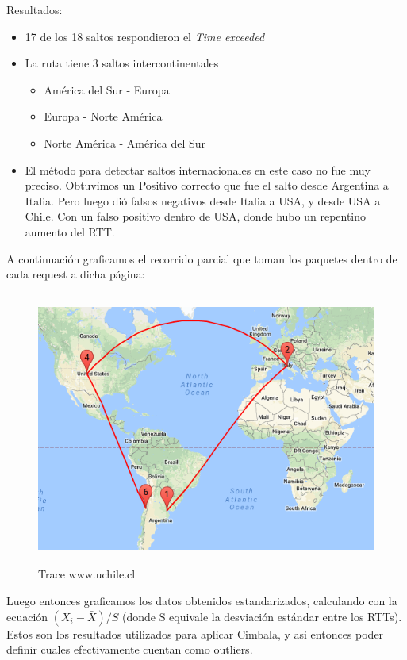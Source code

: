 \documentclass[a4paper,10pt]{article}
\begin{document}
\medskip
\medskip
\medskip

\medskip
\par{Resultados:}
\begin{itemize}
    \item  17 de los 18 saltos respondieron el \textit{Time exceeded}
    \item La ruta tiene 3 saltos intercontinentales
    \begin{itemize}
        \item América del Sur - Europa
        \item Europa - Norte América
        \item Norte América - América del Sur
    \end{itemize}
    \item El método para detectar saltos internacionales en este caso no fue muy preciso. Obtuvimos un Positivo correcto que fue el salto desde Argentina a Italia. Pero luego dió falsos negativos desde Italia a USA, y desde USA a Chile. Con un falso positivo dentro de USA, donde hubo un repentino aumento del RTT.
\end{itemize}

\medskip
\par{A continuación graficamos el recorrido parcial que toman los paquetes dentro de cada request a dicha página: }
\medskip
\begin{figure}[H]
    \centering
    \includegraphics[height=9cm]{imagenes/chileUniChile.png}
    \caption{Trace www.uchile.cl}
\end{figure}


\medskip
\medskip
\par{Luego entonces graficamos los datos obtenidos estandarizados, calculando con la ecuación $(X_{i} - \bar{X}) /S $ (donde S equivale la desviación estándar entre los RTTs). Estos son los resultados utilizados para aplicar Cimbala, y asi entonces poder definir cuales efectivamente cuentan como outliers.}
\end{document}
